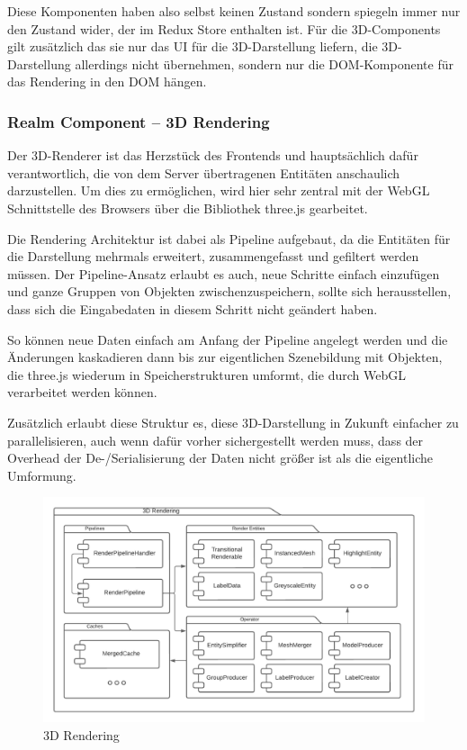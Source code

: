 Diese Komponenten haben also selbst keinen Zustand sondern spiegeln immer nur den Zustand wider, der im Redux Store enthalten ist.
Für die 3D-Components gilt zusätzlich das sie nur das UI für die 3D-Darstellung liefern, die 3D-Darstellung allerdings nicht übernehmen, sondern nur die DOM-Komponente für das Rendering in den DOM hängen.

\subsubsection{Realm Component – 3D Rendering}

Der 3D-Renderer ist das Herzstück des Frontends und hauptsächlich dafür verantwortlich, die von dem Server übertragenen Entitäten anschaulich darzustellen.
Um dies zu ermöglichen, wird hier sehr zentral mit der WebGL Schnittstelle des Browsers über die Bibliothek three.js gearbeitet.

Die Rendering Architektur ist dabei als Pipeline aufgebaut, da die Entitäten für die Darstellung mehrmals erweitert, zusammengefasst und gefiltert werden müssen.
Der Pipeline-Ansatz erlaubt es auch, neue Schritte einfach einzufügen und ganze Gruppen von Objekten zwischenzuspeichern, sollte sich herausstellen, dass sich die Eingabedaten in diesem Schritt nicht geändert haben.

So können neue Daten einfach am Anfang der Pipeline angelegt werden und die Änderungen kaskadieren dann bis zur eigentlichen Szenebildung mit Objekten, die three.js wiederum in Speicherstrukturen umformt, die durch WebGL verarbeitet werden können.

Zusätzlich erlaubt diese Struktur es, diese 3D-Darstellung in Zukunft einfacher zu parallelisieren,
auch wenn dafür vorher sichergestellt werden muss, dass der Overhead der De-/Serialisierung der Daten nicht größer ist als die eigentliche Umformung.

\begin{figure}[htb]
    \centering
    \includegraphics[scale=.65,center]{medien/3d-rendering.pdf}
    \caption{3D Rendering}
    \ownsource
    \label{fig:3d-rendering}
\end{figure}

